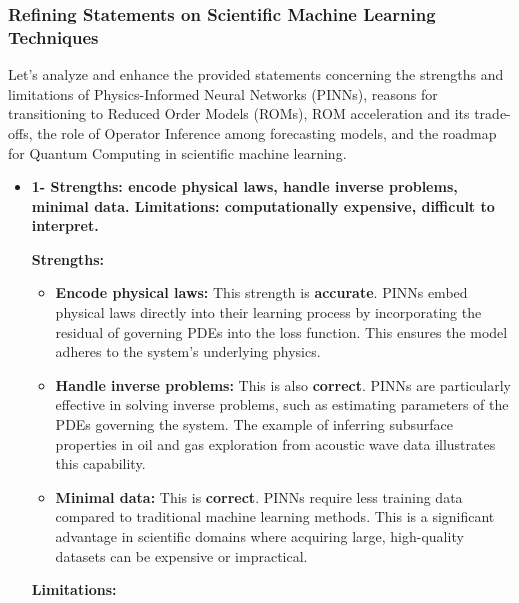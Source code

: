 \documentclass[
]{article}
\author{}
\date{}
\begin{document}
\subsubsection{Refining Statements on Scientific Machine Learning
Techniques}\label{refining-statements-on-scientific-machine-learning-techniques}

Let's analyze and enhance the provided statements concerning the
strengths and limitations of Physics-Informed Neural Networks (PINNs),
reasons for transitioning to Reduced Order Models (ROMs), ROM
acceleration and its trade-offs, the role of Operator Inference among
forecasting models, and the roadmap for Quantum Computing in scientific
machine learning.

\begin{itemize}
\item
  \textbf{1- Strengths: encode physical laws, handle inverse problems,
  minimal data. Limitations: computationally expensive, difficult to
  interpret.}

  \textbf{Strengths:}

  \begin{itemize}
  
  \item
    \textbf{Encode physical laws:} This strength is \textbf{accurate}.
    PINNs embed physical laws directly into their learning process by
    incorporating the residual of governing PDEs into the loss function.
    This ensures the model adheres to the system's underlying physics.
  \item
    \textbf{Handle inverse problems:} This is also \textbf{correct}.
    PINNs are particularly effective in solving inverse problems, such
    as estimating parameters of the PDEs governing the system. The
    example of inferring subsurface properties in oil and gas
    exploration from acoustic wave data illustrates this capability.
  \item
    \textbf{Minimal data:} This is \textbf{correct}. PINNs require less
    training data compared to traditional machine learning methods. This
    is a significant advantage in scientific domains where acquiring
    large, high-quality datasets can be expensive or impractical.
  \end{itemize}

  \textbf{Limitations:}

  \begin{itemize}
  

\end{itemize}
\end{itemize}
\end{document}
